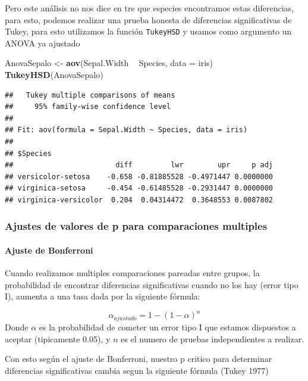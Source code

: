 \documentclass[]{article}
\newenvironment{Shaded}{\begin{snugshade}}{\end{snugshade}}
\newcommand{\KeywordTok}[1]{\textcolor[rgb]{0.13,0.29,0.53}{\textbf{#1}}}
\newcommand{\DataTypeTok}[1]{\textcolor[rgb]{0.13,0.29,0.53}{#1}}
\newcommand{\StringTok}[1]{\textcolor[rgb]{0.31,0.60,0.02}{#1}}
\newcommand{\OperatorTok}[1]{\textcolor[rgb]{0.81,0.36,0.00}{\textbf{#1}}}
\newcommand{\NormalTok}[1]{#1}
\let\oldparagraph\paragraph
\renewcommand{\paragraph}[1]{\oldparagraph{#1}\mbox{}}
\begin{document}
Pero este análisis no nos dice en tre que especies encontramos estas
diferencias, para esto, podemos realizar una prueba honesta de
diferencias significativas de Tukey, para esto utilizamos la función
\texttt{TukeyHSD} y usamos como argumento un ANOVA ya ajustado

\begin{Shaded}
\begin{Highlighting}[]
\NormalTok{AnovaSepalo <-}\StringTok{ }\KeywordTok{aov}\NormalTok{(Sepal.Width }\OperatorTok{~}\StringTok{ }\NormalTok{Species, }\DataTypeTok{data =}\NormalTok{ iris)}
\KeywordTok{TukeyHSD}\NormalTok{(AnovaSepalo)}
\end{Highlighting}
\end{Shaded}

\begin{verbatim}
##   Tukey multiple comparisons of means
##     95% family-wise confidence level
## 
## Fit: aov(formula = Sepal.Width ~ Species, data = iris)
## 
## $Species
##                        diff         lwr        upr     p adj
## versicolor-setosa    -0.658 -0.81885528 -0.4971447 0.0000000
## virginica-setosa     -0.454 -0.61485528 -0.2931447 0.0000000
## virginica-versicolor  0.204  0.04314472  0.3648553 0.0087802
\end{verbatim}

\subsubsection{Ajustes de valores de p para comparaciones
multiples}\label{ajustes-de-valores-de-p-para-comparaciones-multiples}

\paragraph{Ajuste de Bonferroni}\label{ajuste-de-bonferroni}

Cuando realizamos multiples comparaciones pareadas entre grupos, la
probabilidad de encontrar diferencias significativas cuando no los hay
(error tipo I), aumenta a una tasa dada por la siguiente fórmula:

\[\alpha_{ajustado} = 1 - (1 -\alpha)^n\] Donde \(\alpha\) es la
probabilidad de cometer un error tipo I que estamos dispuestos a aceptar
(tipicamente 0.05), y \(n\) es el numero de pruebas independientes a
realizar.

Con esto según el ajuste de Bonferroni, nuestro p critico para
determinar diferencias significativas cambia segun la siguiente fórmula
(Tukey 1977)
\end{document}
